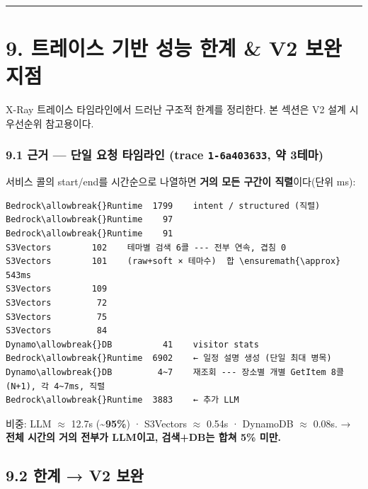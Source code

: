 \documentclass[11pt,a4paper]{article}
\newcommand{\DocNeedspace}[1]{\par\ifdim\dimexpr\pagegoal-\pagetotal\relax<#1\newpage\fi}
\begin{document}
\begin{center}\rule{0.5\linewidth}{0.5pt}\end{center}

\newpage
\DocNeedspace{8\baselineskip}
\section*{9. 트레이스 기반 성능 한계 \& V2 보완 지점}

X-Ray 트레이스 타임라인에서 드러난 구조적 한계를 정리한다. 본 섹션은 V2 설계 시 우선순위 참고용이다.

\subsubsection{\texorpdfstring{9.1 근거 --- 단일 요청 타임라인 (trace \texttt{1-\allowbreak{}6a403633}, 약 3테마)}{9.1 근거 --- 단일 요청 타임라인 (trace 1-6a403633, 약 3테마)}}\label{uxadfcuxac70-uxb2e8uxc77c-uxc694uxccad-uxd0c0uxc784uxb77cuxc778-trace-1-6a403633-uxc57d-3uxd14cuxb9c8}

서비스 콜의 start/end를 시간순으로 나열하면 \textbf{거의 모든 구간이 직렬}이다(단위 ms):

\begin{verbatim}
Bedrock\allowbreak{}Runtime  1799    intent / structured (직렬)
Bedrock\allowbreak{}Runtime    97
Bedrock\allowbreak{}Runtime    91
S3Vectors        102    테마별 검색 6콜 --- 전부 연속, 겹침 0
S3Vectors        101    (raw+soft × 테마수)  합 \ensuremath{\approx} 543ms
S3Vectors        109
S3Vectors         72
S3Vectors         75
S3Vectors         84
Dynamo\allowbreak{}DB          41    visitor stats
Bedrock\allowbreak{}Runtime  6902    ← 일정 설명 생성 (단일 최대 병목)
Dynamo\allowbreak{}DB         4~7    재조회 --- 장소별 개별 GetItem 8콜 (N+1), 각 4~7ms, 직렬
Bedrock\allowbreak{}Runtime  3883    ← 추가 LLM
\end{verbatim}

비중: LLM \ensuremath{\approx} 12.7s (\textbf{\textasciitilde95\%}) · S3Vectors \ensuremath{\approx} 0.54s · Dynamo\allowbreak{}DB \ensuremath{\approx} 0.08s. → \textbf{전체 시간의 거의 전부가 LLM이고, 검색+DB는 합쳐 5\% 미만.}

\DocNeedspace{6\baselineskip}
\subsection*{9.2 한계 → V2 보완}
\end{document}
